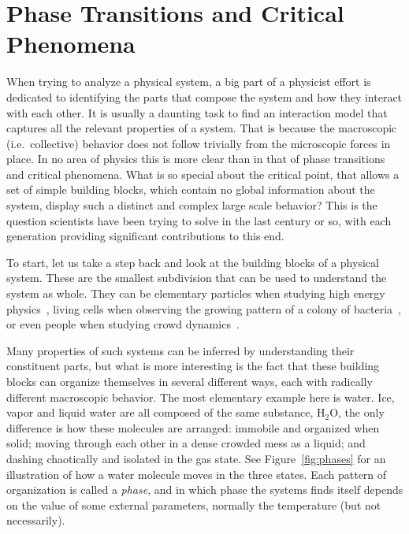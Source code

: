 \chapter{Phase Transitions and Critical Phenomena}
\label{ch:crit}

When trying to analyze a physical system, a big part of a physicist effort is
dedicated to identifying the parts that compose the system and how they
interact with each other. It is usually a daunting task to find an interaction
model that captures all the relevant properties of a system. That is because the
macroscopic (i.e.\ collective) behavior does not follow trivially from the
microscopic forces in place. In no area of physics this is more clear than in
that of phase transitions and critical phenomena. What is so special about the
critical point, that allows a set of simple building blocks, which contain no
global information about the system, display such a distinct and complex large
scale behavior? This is the question scientists have been trying to solve in
the last century or so, with each generation providing significant
contributions to this end.


To start, let us take a step back and look at the building blocks of a physical
system. These are the smallest subdivision that can be used to understand the
system as whole. They can be elementary particles when studying high energy
physics~\cite{Boyanovsky2006}, living cells when observing the growing pattern
of a colony of bacteria~\cite{Matsushita1990}, or even people when studying
crowd dynamics~\cite{Minoru1999}.

Many properties of such systems can be inferred by understanding their
constituent parts, but what is more interesting is the fact that these building
blocks can organize themselves in several different ways, each with radically
different macroscopic behavior. The most elementary example here is water. Ice,
vapor and liquid water are all composed of the same substance, H${}_2$O, the
only difference is how these molecules are arranged: immobile and organized
when solid; moving through each other in a dense crowded mess as a liquid; and
dashing chaotically and isolated in the gas state. See Figure~\ref{fig:phases}
for an illustration of how a water molecule moves in the three states. Each
pattern of organization is called a \textit{phase}, and in which phase the
systems finds itself depends on the value of some external parameters, normally
the temperature (but not necessarily).

